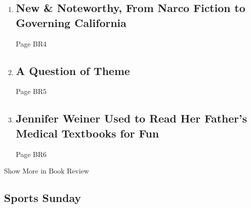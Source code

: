 \begin{enumerate}
\def\labelenumi{\arabic{enumi}.}
\item
  \href{/2020/05/05/books/review/new-this-week.html}{}

  \hypertarget{new--noteworthy-from-narco-fiction-to-governing-california}{%
  \subsection{New \& Noteworthy, From Narco Fiction to Governing
  California}\label{new--noteworthy-from-narco-fiction-to-governing-california}}

  Page BR4
\item
  \href{/2020/05/08/books/review/letters-moynihan-adichie.html}{}

  \hypertarget{a-question-of-theme}{%
  \subsection{A Question of Theme}\label{a-question-of-theme}}

  Page BR5
\item
  \href{/2020/05/07/books/review/jennifer-weiner-by-the-book-interview.html}{}

  \hypertarget{jennifer-weiner-used-to-read-her-fathers-medical-textbooks-for-fun}{%
  \subsection{Jennifer Weiner Used to Read Her Father's Medical
  Textbooks for
  Fun}\label{jennifer-weiner-used-to-read-her-fathers-medical-textbooks-for-fun}}

  Page BR6
\end{enumerate}

Show More in Book Review

\hypertarget{sports-sunday}{%
\subsection{Sports Sunday}\label{sports-sunday}}

